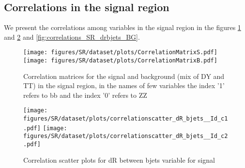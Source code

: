 

\subsection{Correlations in the signal region}
We present the correlations among variables in the signal region in
the figures \ref{fig:corrMatrix_SR} and
\ref{fig:correlations_SR_drbjets_S} and \ref{fig:correlations_SR_drbjets_BG}.

\begin{figure}[!htb]%
\centering
\texttt{[image: figures/SR/dataset/plots/CorrelationMatrixS.pdf]}
\bigbreak
\texttt{[image: figures/SR/dataset/plots/CorrelationMatrixB.pdf]}
\caption{ Correlation matrices for the signal and background (mix of DY and TT) in the signal region, in the names of few variables the index '1' refers to bb and the index '0' refers to ZZ}
\label{fig:corrMatrix_SR}                                                       
\end{figure}





\begin{figure}[!htb]%
\centering
\texttt{[image: figures/SR/dataset/plots/correlationscatter\_dR\_bjets\_\_Id\_c1.pdf]}
\texttt{[image: figures/SR/dataset/plots/correlationscatter\_dR\_bjets\_\_Id\_c2.pdf]}
\caption{ Correlation scatter plots for dR between bjets variable for signal}%
\label{fig:correlations_SR_drbjets_S}                                                       
\end{figure}
\clearpage


